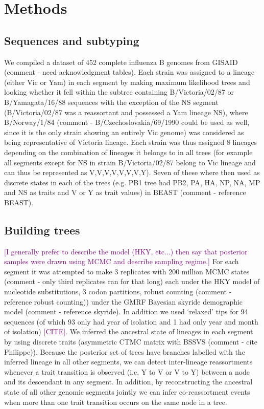 \documentclass[11pt,oneside,letterpaper]{article}
\def\tbc#1{\textcolor{purple}{[#1]}}
\begin{document}
\section*{Methods}

\subsection*{Sequences and subtyping}
We compiled a dataset of 452 complete influenza B genomes from GISAID (comment - need acknowledgment tables). 
Each strain was assigned to a lineage (either Vic or Yam) in each segment by making maximum likelihood trees and looking whether it fell within the subtree containing B/Victoria/02/87 or B/Yamagata/16/88 sequences with the exception of the NS segment (B/Victoria/02/87 was a reassortant and possessed a Yam lineage NS), where B/Norway/1/84 (comment - B/Czechoslovakia/69/1990 could be used as well, since it is the only strain showing an entirely Vic genome) was considered as being representative of Victoria lineage.
Each strain was thus assigned 8 lineages depending on the combination of lineages it belongs to in all trees (for example all segments except for NS in strain B/Victoria/02/87 belong to Vic lineage and can thus be represented as V,V,V,V,V,V,V,Y). 
Seven of these where then used as discrete states in each of the trees (e.g. PB1 tree had PB2, PA, HA, NP, NA, MP and NS as traits and V or Y as trait values) in BEAST (comment - reference BEAST).

\subsection*{Building trees}
\tbc{I generally prefer to describe the model (HKY, etc...) then say that posterior samples were drawn using MCMC and describe sampling regime.}
For each segment it was attempted to make 3 replicates with 200 million MCMC states (comment - only third replicates ran for that long) each under the HKY model of nucleotide substitutions, 3 codon partitions, robust counting (comment - reference robust counting)) under the GMRF Bayesian skyride demographic model (comment - reference skyride).
In addition we used `relaxed' tips for 94 sequences (of which 93 only had year of isolation and 1 had only year and month of isolation) \tbc{CITE}.
We inferred the ancestral state of lineages in each segment by using discrete traits (asymmetric CTMC matrix with BSSVS (comment - cite Philippe)). Because the posterior set of trees have branches labelled with the inferred lineage in all other segments, we can detect inter-lineage reassortments whenever a trait transition is observed (i.e. Y to V or V to Y) between a node and its descendant in any segment. 
In addition, by reconstructing the ancestral state of all other genomic segments jointly we can infer co-reassortment events when more than one trait transition occurs on the same node in a tree.
\end{document}
